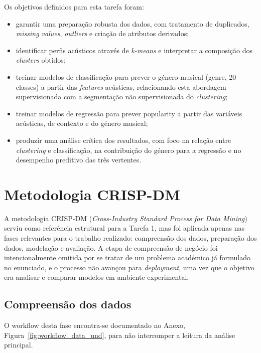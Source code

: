 \documentclass[11pt,a4paper]{article}
\newcommand{\code}[1]{{\ttfamily\hyphenchar\font=45\relax #1}}
\begin{document}
Os objetivos definidos para esta tarefa foram:
\begin{itemize}
    \item garantir uma preparação robusta dos dados, com tratamento de duplicados, \textit{missing values}, \textit{outliers} e criação de atributos derivados;
    \item identificar perfis acústicos através de \textit{k-means} e interpretar a composição dos \textit{clusters} obtidos;
    \item treinar modelos de classificação para prever o género musical (\code{genre}, 20 classes) a partir das \textit{features} acústicas, relacionando esta abordagem supervisionada com a segmentação não supervisionada do \textit{clustering};
    \item treinar modelos de regressão para prever \code{popularity} a partir das variáveis acústicas, de contexto e do género musical;
    \item produzir uma análise crítica dos resultados, com foco na relação entre \textit{clustering} e classificação, na contribuição do género para a regressão e no desempenho preditivo das três vertentes.
\end{itemize}

\section{Metodologia CRISP-DM}

A metodologia CRISP-DM (\textit{Cross-Industry Standard Process for Data Mining}) serviu como referência estrutural para a Tarefa 1, mas foi aplicada apenas nas fases relevantes para o trabalho realizado: compreensão dos dados, preparação dos dados, modelação e avaliação. A etapa de compreensão de negócio foi intencionalmente omitida por se tratar de um problema académico já formulado no enunciado, e o processo não avançou para \textit{deployment}, uma vez que o objetivo era analisar e comparar modelos em ambiente experimental.

\subsection{Compreensão dos dados}

O workflow desta fase encontra-se documentado no Anexo, Figura~\ref{fig:workflow_data_und}, para não interromper a leitura da análise principal.
\end{document}
